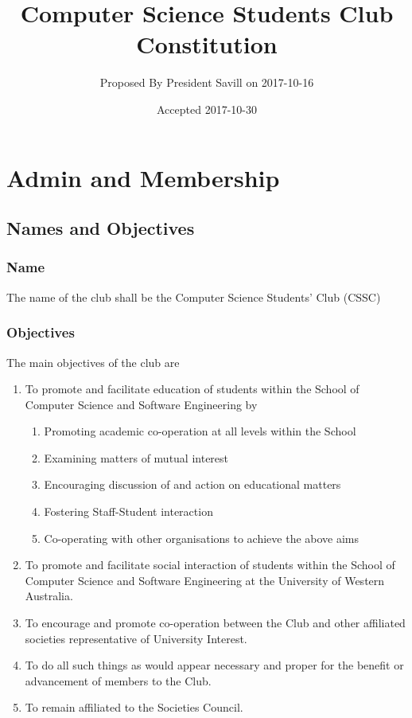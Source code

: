 \documentclass[10pt,a4paper]{report}
\author{Proposed By President Savill on 2017-10-16}
\date{Accepted 2017-10-30}
\title{Computer Science Students Club Constitution}
\begin{document}
	\maketitle
	\newpage
	\begin{small}
		\tableofcontents
	\end{small}
	\newpage

	\chapter{Admin and Membership}

	\section{Names and Objectives}
		\subsection{Name}
			The name of the club shall be the Computer Science Students' Club (CSSC)

		\subsection{Objectives}
		The main objectives of the club are
			\begin{enumerate}[label=\alph*]
				\item To promote and facilitate education of students within the School of Computer Science and Software Engineering by
				\begin{enumerate}[label=\roman*]
					\item Promoting academic co-operation at all levels within the School
					\item Examining matters of mutual interest
					\item Encouraging discussion of and action on educational matters
					\item Fostering Staff-Student interaction
					\item Co-operating with other organisations to achieve the above aims
				\end{enumerate}
				\item To promote and facilitate social interaction of students within the School of Computer Science and Software Engineering at the University of Western Australia.
				\item To encourage and promote co-operation between the Club and other affiliated societies representative of University Interest.
				\item To do all such things as would appear necessary and proper for the benefit or advancement of members to the Club.
				\item To remain affiliated to the Societies Council.
			\end{enumerate}
\end{document}
